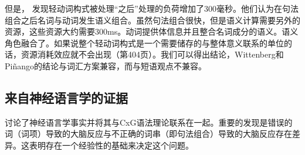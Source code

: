 \begin{exe}
\begin{xlist}[iv.]
\begin{exe}
\begin{xlist}[iv.]
但是， \citet{WP2011a}发现轻动词构式被处理“之后”处理的负荷增加了300毫秒。他们认为在句法组合之后名词与动词发生语义组合。虽然句法组合很快，但是语义计算需要另外的资源，这些资源大约需要300ms。动词提供体信息并且整合名词成分的语义。语义角色融合了。如果说整个轻动词构式是一个需要储存的与整体意义联系的单位的话，资源消耗效应就不会出现（第404页）。我们可以得出结论，Wittenberg和Piñango的结论与词汇方案兼容，而与短语观点不兼容。

\subsection{来自神经语言学的证据}
\label{sec-neuro-linguistics}

\mbox{}\citet*{PCShandbookCxG}讨论了神经语言学事实并将其与CxG语法理论联系在一起。重要的发现是错误的词（词项）导致的大脑反应与不正确的词串（即句法组合）导致的大脑反应存在差异。这表明存在一个经验性的基础来决定这个问题。


\end{xlist}
\end{exe}
\end{xlist}
\end{exe}

